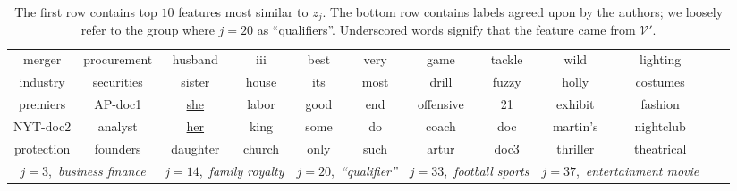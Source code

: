 \documentclass[a4paper]{article}
\newcommand{\cVp}{\mathcal{V'}}
\newcommand{\ffont}[1]{\underline{#1}}
\begin{document}
\begin{table}[t!]%
\centering
\begin{adjustbox}{width=1\textwidth}
\begin{tabular}{|cc|cc|cc|cc|cc|cc|}
\hline
 merger & procurement& husband & iii & best & very & game & tackle & wild  & lighting\\
 industry & securities & sister & house & its & most & drill & fuzzy & holly & costumes\\
 premiers & AP-doc1 & \ffont{she} & labor & good & end & offensive & 21 & exhibit & fashion\\
 NYT-doc2 & analyst & \ffont{her} & king & some & do & coach & doc & martin’s & nightclub\\
 protection & founders & daughter & church & only & such & artur & doc3 &  thriller & theatrical \\ \hline
 \multicolumn{2}{|c|}{$j{=}3$,\ \textit{business finance}} & \multicolumn{2}{|c|}{$j{=}14$,\ \textit{family royalty}} & \multicolumn{2}{|c|}{$j{=}20$,\ \textit{``qualifier''}} & \multicolumn{2}{|c|}{$j{=}33$,\ \textit{football sports}} & \multicolumn{2}{|c|}{$j{=}37$,\ \textit{entertainment movie}} \\ \hline
\end{tabular}
\end{adjustbox}
\caption{ %
  The first row contains top $10$ features most similar to $z_{j}$. The
  bottom row contains labels agreed upon by the authors; %
  we loosely refer to the group where $j=20$ as ``qualifiers''. Underscored words signify that the feature came from $\cVp$.}
\label{tab:interpret_lat_concepts}
\end{table}
\end{document}

